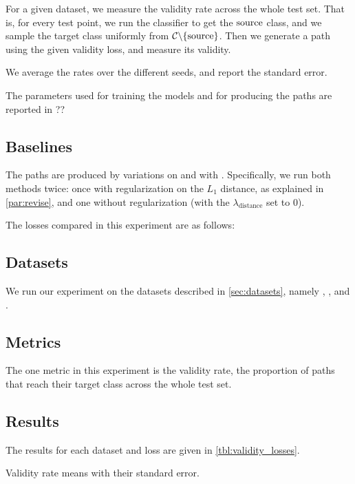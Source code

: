 \documentclass[../main.tex]{subfiles}
\begin{document}
For a given dataset, we measure the validity rate across the whole test set.
That is, for every test point, we run the classifier to get the $\mathrm{source}$ class, and we sample the target class uniformly from $\mathcal{C} \backslash \{\mathrm{source}\}$.
Then we generate a path using the given validity loss, and measure its validity.

We average the rates over the different seeds, and report the standard error.

The parameters used for training the models and for producing the paths are reported in ?? 

\subsection{Baselines}

The paths are produced by variations on \ls{} and with \revise{}.
Specifically, we run both methods twice: once with regularization on the $L_1$ distance, as explained in \autoref{par:revise}, and one without regularization (with the $\lambda_\text{distance}$ set to 0).

The losses compared in this experiment are as follows:

\subsection{Datasets}

We run our experiment on the datasets described in \autoref{sec:datasets}, namely \CakeOnSea, \ForestCover, \WineQuality{} and \OnlineNewsPopularity.

\subsection{Metrics}

The one metric in this experiment is the validity rate, \ie{} the proportion of paths that reach their target class across the whole test set.

\subsection{Results}

The results for each dataset and loss are given in \autoref{tbl:validity_losses}.

\begin{table}[h!]
    \caption{Validity rate means with their standard error.}
\label{tbl:validity_losses}
    
\end{table}
\end{document}
